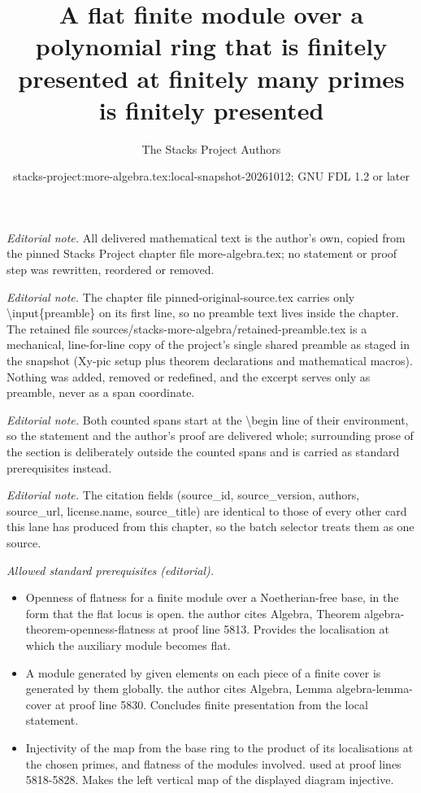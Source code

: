 \documentclass[10pt,a4paper]{amsart}
\title{A flat finite module over a polynomial ring that is finitely presented at finitely many primes is finitely presented}
\author{The Stacks Project Authors}
\date{stacks-project:more-algebra.tex:local-snapshot-20261012; GNU FDL 1.2 or later}
\theoremstyle{plain}
\theoremstyle{definition}
\theoremstyle{remark}
\numberwithin{equation}{subsection}
\begin{document}
\maketitle
\setcounter{subsection}{1}
\noindent\textit{Editorial note.} All delivered mathematical text is the author's own, copied from the pinned Stacks Project chapter file more-algebra.tex; no statement or proof step was rewritten, reordered or removed.\par\medskip
\noindent\textit{Editorial note.} The chapter file pinned-original-source.tex carries only \textbackslash{}input\{preamble\} on its first line, so no preamble text lives inside the chapter. The retained file sources/stacks-more-algebra/retained-preamble.tex is a mechanical, line-for-line copy of the project's single shared preamble as staged in the snapshot (Xy-pic setup plus theorem declarations and mathematical macros). Nothing was added, removed or redefined, and the excerpt serves only as preamble, never as a span coordinate.\par\medskip
\noindent\textit{Editorial note.} Both counted spans start at the \textbackslash{}begin line of their environment, so the statement and the author's proof are delivered whole; surrounding prose of the section is deliberately outside the counted spans and is carried as standard prerequisites instead.\par\medskip
\noindent\textit{Editorial note.} The citation fields (source\_id, source\_version, authors, source\_url, license.name, source\_title) are identical to those of every other card this lane has produced from this chapter, so the batch selector treats them as one source.\par\medskip
\noindent\textit{Allowed standard prerequisites (editorial).}\begin{itemize}
\item Openness of flatness for a finite module over a Noetherian-free base, in the form that the flat locus is open. the author cites Algebra, Theorem algebra-theorem-openness-flatness at proof line 5813. Provides the localisation at which the auxiliary module becomes flat.
\item A module generated by given elements on each piece of a finite cover is generated by them globally. the author cites Algebra, Lemma algebra-lemma-cover at proof line 5830. Concludes finite presentation from the local statement.
\item Injectivity of the map from the base ring to the product of its localisations at the chosen primes, and flatness of the modules involved. used at proof lines 5818-5828. Makes the left vertical map of the displayed diagram injective.
\end{itemize}\medskip
\end{document}
